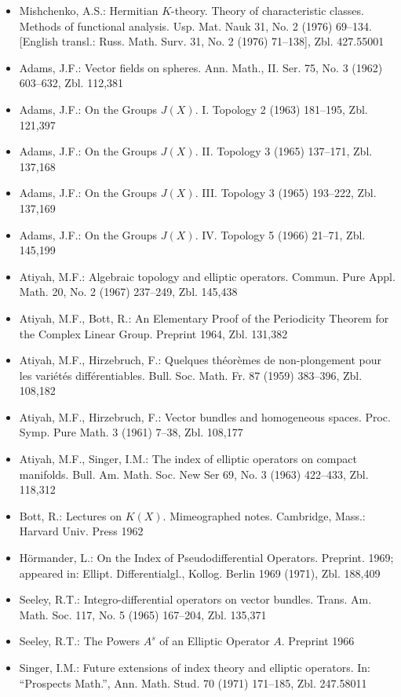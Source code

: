 \begin{itemize}
\item Mishchenko, A.S.: Hermitian $K$-theory. Theory of characteristic classes. Methods of functional analysis. Usp. Mat. Nauk 31, No. 2 (1976) 69--134. [English transl.: Russ. Math. Surv. 31, No. 2 (1976) 71--138], Zbl. 427.55001
\item Adams, J.F.: Vector fields on spheres. Ann. Math., II. Ser. 75, No. 3 (1962) 603--632, Zbl. 112,381
\item Adams, J.F.: On the Groups $J(X)$. I. Topology 2 (1963) 181--195, Zbl. 121,397
\item Adams, J.F.: On the Groups $J(X)$. II. Topology 3 (1965) 137--171, Zbl. 137,168
\item Adams, J.F.: On the Groups $J(X)$. III. Topology 3 (1965) 193--222, Zbl. 137,169
\item Adams, J.F.: On the Groups $J(X)$. IV. Topology 5 (1966) 21--71, Zbl. 145,199
\item Atiyah, M.F.: Algebraic topology and elliptic operators. Commun. Pure Appl. Math. 20, No. 2 (1967) 237--249, Zbl. 145,438
\item Atiyah, M.F., Bott, R.: An Elementary Proof of the Periodicity Theorem for the Complex Linear Group. Preprint 1964, Zbl. 131,382
\item Atiyah, M.F., Hirzebruch, F.: Quelques théorèmes de non-plongement pour les variétés différentiables. Bull. Soc. Math. Fr. 87 (1959) 383--396, Zbl. 108,182
\item Atiyah, M.F., Hirzebruch, F.: Vector bundles and homogeneous spaces. Proc. Symp. Pure Math. 3 (1961) 7--38, Zbl. 108,177
\item Atiyah, M.F., Singer, I.M.: The index of elliptic operators on compact manifolds. Bull. Am. Math. Soc. New Ser 69, No. 3 (1963) 422--433, Zbl. 118,312
\item Bott, R.: Lectures on $K(X)$. Mimeographed notes. Cambridge, Mass.: Harvard Univ. Press 1962
\item Hörmander, L.: On the Index of Pseudodifferential Operators. Preprint. 1969; appeared in: Ellipt. Differentialgl., Kollog. Berlin 1969 (1971), Zbl. 188,409
\item Seeley, R.T.: Integro-differential operators on vector bundles. Trans. Am. Math. Soc. 117, No. 5 (1965) 167--204, Zbl. 135,371
\item Seeley, R.T.: The Powers $A^s$ of an Elliptic Operator $A$. Preprint 1966
\item Singer, I.M.: Future extensions of index theory and elliptic operators. In: ``Prospects Math.'', Ann. Math. Stud. 70 (1971) 171--185, Zbl. 247.58011
\end{itemize}

